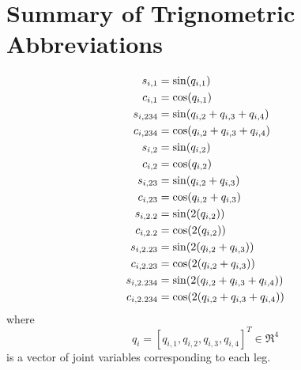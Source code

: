 \chapter{Summary of Trignometric Abbreviations}
	\label{appendix::e}

		\begin{equation*}
		\begin{split}\small
			s_{i,1} 	&= \sin(q_{i,1})					\\
			c_{i,1} 	&= \cos(q_{i,1})					\\
			s_{i,234} 	&= \sin(q_{i,2}+q_{i,3}+q_{i,4})	\\
			c_{i,234} 	&= \cos(q_{i,2}+q_{i,3}+q_{i,4})	\\
			s_{i,2} 	&= \sin(q_{i,2})					\\
			c_{i,2} 	&= \cos(q_{i,2})					\\
			s_{i,23} 	&= \sin(q_{i,2}+q_{i,3})			\\
			c_{i,23} 	&= \cos(q_{i,2}+q_{i,3})			\\
			s_{i,2.2} 	&= \sin(2(q_{i,2}))					\\
			c_{i,2.2} 	&= \cos(2(q_{i,2}))					\\
			s_{i,2.23} 	&= \sin(2(q_{i,2}+q_{i,3}))			\\
			c_{i,2.23} 	&= \cos(2(q_{i,2}+q_{i,3}))			\\
			s_{i,2.234}	&= \sin(2(q_{i,2}+q_{i,3}+q_{i,4}))	\\
			c_{i,2.234} &= \cos(2(q_{i,2}+q_{i,3}+q_{i,4}))	\\
		\end{split}
	\end{equation*}
	where 
	\begin{equation*}
		q_{i} = [q_{i,1},q_{i,2},q_{i,3},q_{i,4}]^{T} \in \Re^{4} 
	\end{equation*}
	is a vector of joint variables corresponding to each \Ith leg.